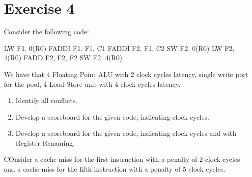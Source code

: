 \section{Exercise 4}

Consider the following code:
\begin{verbnobox}[\verbarg]
LW F1, 0(R0)
FADDI F1, F1, C1
FADDI F2, F1, C2
SW F2, 0(R0)
LW F2, 4(R0)
FADD F2, F2, F2
SW F2, 4(R0)
\end{verbnobox}
We have that 4 Floating Point ALU with 2 clock cycles latency, single write port for the pool, 4 Load Store unit with 4 clock cycles latency. 
\begin{enumerate}
    \item Identify all conflicts.
    \item Develop a scoreboard for the given code, indicating clock cycles.
    \item Develop a scoreboard for the given code, indicating clock cycles and with Register Renaming.
\end{enumerate}
COnsider a cache miss for the first instruction with a penalty of 2 clock cycles and a cache miss for the fifth instruction with a penalty of 5 clock cycles.

